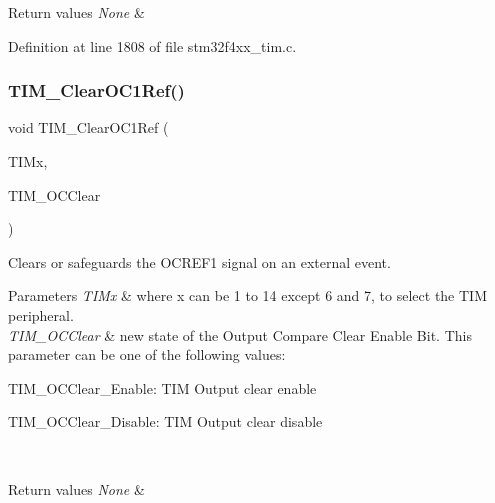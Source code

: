 \begin{DoxyRetVals}{Return values}
{\em None} & \\
\hline
\end{DoxyRetVals}


Definition at line 1808 of file stm32f4xx\+\_\+tim.\+c.

\mbox{\label{group___t_i_m___group2_ga34e926cd8a99cfcc7480b2d6de5118b6}} 
\subsubsection{\texorpdfstring{T\+I\+M\+\_\+\+Clear\+O\+C1\+Ref()}{TIM\_ClearOC1Ref()}}
{\footnotesize\ttfamily void T\+I\+M\+\_\+\+Clear\+O\+C1\+Ref (\begin{DoxyParamCaption}\item[{\hyperlink{struct_t_i_m___type_def}{T\+I\+M\+\_\+\+Type\+Def} $\ast$}]{T\+I\+Mx,  }\item[{uint16\+\_\+t}]{T\+I\+M\+\_\+\+O\+C\+Clear }\end{DoxyParamCaption})}



Clears or safeguards the O\+C\+R\+E\+F1 signal on an external event. 


\begin{DoxyParams}{Parameters}
{\em T\+I\+Mx} & where x can be 1 to 14 except 6 and 7, to select the T\+IM peripheral. \\
\hline
{\em T\+I\+M\+\_\+\+O\+C\+Clear} & new state of the Output Compare Clear Enable Bit. This parameter can be one of the following values\+: \begin{DoxyItemize}
\item T\+I\+M\+\_\+\+O\+C\+Clear\+\_\+\+Enable\+: T\+IM Output clear enable \item T\+I\+M\+\_\+\+O\+C\+Clear\+\_\+\+Disable\+: T\+IM Output clear disable \end{DoxyItemize}
\\
\hline
\end{DoxyParams}

\begin{DoxyRetVals}{Return values}
{\em None} & \\
\hline
\end{DoxyRetVals}


